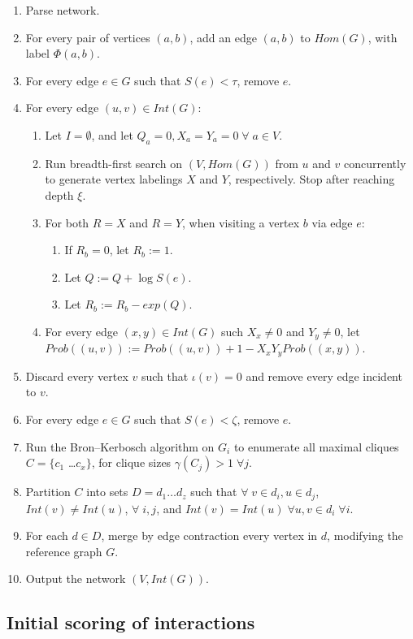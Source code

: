 \documentclass[12pt,twoside]{article}
\def\NS{
	\setlength{\itemsep}{0.1em}
	\setlength{\parskip}{0em}
	\setlength{\parsep}{0em}
}
\begin{document}
\vspace{-0.5em} \begin{enumerate}
\NS
\item Parse network.
\item For every pair of vertices $(a,b)$, add an edge $(a,b)$ to $Hom(G)$, with label $ \Phi(a,b)$.
\item For every edge $e \in G$ such that $S(e) < \tau$, remove $e$.
\item For every edge $(u,v) \in Int(G)$:
\begin{enumerate}
\item Let $I=\emptyset$, and let $Q_a = 0, X_a = Y_a = 0 \; \forall \; a \in V$.
\item Run breadth-first search on $(V, Hom(G))$ from $u$ and $v$ concurrently to generate vertex labelings $X$ and $Y$, respectively. Stop after reaching depth $\xi$.
\item For both $R=X$ and $R=Y$, when visiting a vertex $b$ via edge $e$:
\begin{enumerate}
\item If $R_b=0$, let $R_b := 1$.
\item Let $Q := Q + \log S(e)$.
\item Let $R_b := R_b - exp(Q)$.
\end{enumerate}
\item For every edge $(x,y) \in Int(G)$ such $X_x \neq 0$ and $Y_y \neq 0$, let $Prob((u,v)) := Prob((u,v)) + 1 - X_x Y_y Prob((x,y))$.
\end{enumerate}
\item Discard every vertex $v$ such that $\iota(v) = 0$ and remove every edge incident to $v$.
\item For every edge $e \in G$ such that $S(e) < \zeta$, remove $e$.
\item Run the Bron--Kerbosch algorithm on $G_i$ to enumerate all maximal cliques $C = \{ c_1$ \ldots $c_x \}$, for clique sizes $\gamma(C_j) > 1 \; \forall j$.
\item Partition $C$ into sets $D = d_1 \ldots d_z$ such that $\forall \; v \in d_i, u \in d_j$, $Int(v) \neq Int(u)$, $\forall \; i,j$, and $Int(v) = Int(u) \; \forall u,v \in d_i \; \forall i$.
\item For each $d \in D$, merge by edge contraction every vertex in $d$, modifying the reference graph $G$.
\item Output the network $(V, Int(G))$.
\end{enumerate}

\subsection{Initial scoring of interactions}
\end{document}
